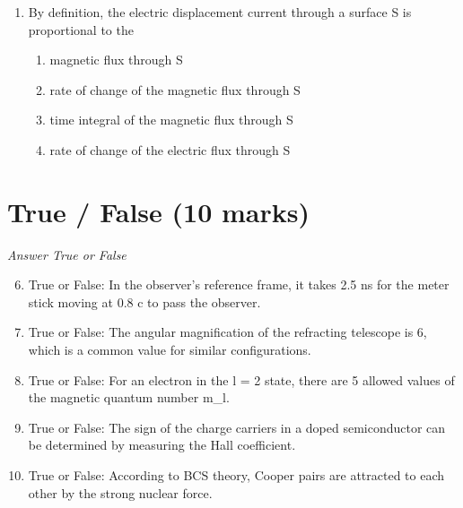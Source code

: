 \documentclass[12pt]{article}
\begin{document}
\begin{enumerate}[label=\arabic*.]
\begin{enumerate}[label=(\alph*)]
    \item rate of change of the electric flux through S
    \item electric flux through S
    \item time integral of the magnetic flux through S
    \item rate of change of the magnetic flux through S
\end{enumerate}
\item By definition, the electric displacement current through a surface S is proportional to the
\begin{enumerate}[label=(\alph*)]
    \item magnetic flux through S
    \item rate of change of the magnetic flux through S
    \item time integral of the magnetic flux through S
    \item rate of change of the electric flux through S
\end{enumerate}
\end{enumerate}

\section*{True / False (10 marks)}
\textit{Answer True or False}
\begin{enumerate}[label=\arabic*.]
\setcounter{enumi}{5}
\item True or False: In the observer's reference frame, it takes 2.5 ns for the meter stick moving at 0.8 c to pass the observer.
\item True or False: The angular magnification of the refracting telescope is 6, which is a common value for similar configurations.
\item True or False: For an electron in the l = 2 state, there are 5 allowed values of the magnetic quantum number m\_l.
\item True or False: The sign of the charge carriers in a doped semiconductor can be determined by measuring the Hall coefficient.
\item True or False: According to BCS theory, Cooper pairs are attracted to each other by the strong nuclear force.
\end{enumerate}
\end{document}
